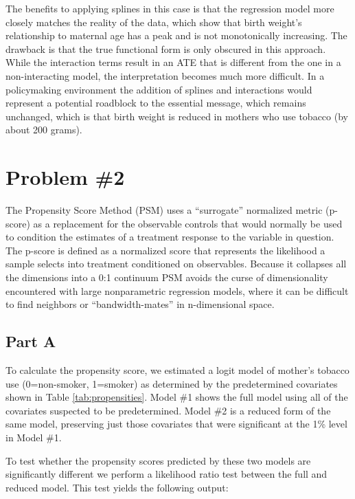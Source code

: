 \documentclass[letterpaper, 12pt]{article}
\begin{document}
The benefits to applying splines in this case is that the regression model more closely matches the reality of the data, which show that birth weight's relationship to maternal age has a peak and is not monotonically increasing.  The drawback is that the true functional form is only obscured in this approach.  While the interaction terms result in an ATE that is different from the one in a non-interacting model, the interpretation becomes much more difficult.  In a policymaking environment the addition of splines and interactions would represent a potential roadblock to the essential message, which remains unchanged, which is that birth weight is reduced in mothers who use tobacco (by about 200 grams).  

\let\clearpage\relax


\section{Problem \#2}

The Propensity Score Method (PSM) uses a ``surrogate'' normalized metric (p-score) as a replacement for the observable controls that would normally be used to condition the estimates of a treatment response to the variable in question.  The p-score is defined as a normalized score that represents the likelihood a sample selects into treatment conditioned on observables.  Because it collapses all the dimensions into a 0:1 continuum PSM avoids the curse of dimensionality encountered with large nonparametric regression models, where it can be difficult to find neighbors or ``bandwidth-mates'' in n-dimensional space.  

\subsection{Part A}

To calculate the propensity score, we estimated a logit model of mother's tobacco use (0=non-smoker, 1=smoker) as determined by the predetermined covariates shown in Table \ref{tab:propensities}. Model \#1 shows the full model using all of the covariates suspected to be predetermined. Model \#2 is a reduced form of the same model, preserving just those covariates that were significant at the 1\% level in Model \#1. 

\let\clearpage\relax
 

To test whether the propensity scores predicted by these two models are significantly different  we perform a likelihood ratio test between  the full and reduced model. This test yields the following output:
\end{document}
